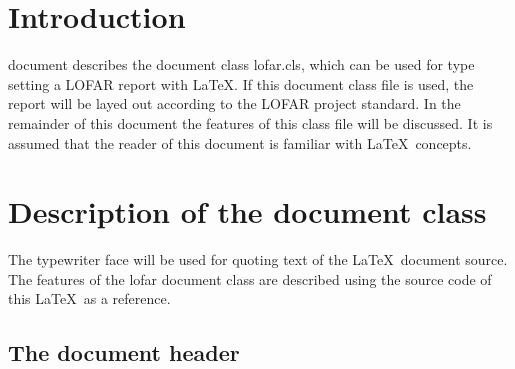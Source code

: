 \documentclass[]{lofar}
\begin{document}
\maketitle
\newpage
%
\theDistributionList
\vspace{1cm}
\theDocumentRevision
\newpage
%
\begin{abstract}
The author has written a document class file \textsf{lofar.cls}, which
may be used to type set reports with \LaTeX. The document class takes
care of type setting a report according to the LOFAR documentation
standard. In this note a description of this document class is
presented. This document is only useful for people who write there
reports with \LaTeX.
\end{abstract}
\newpage
%
\tableofcontents
\newpage

\section{Introduction}
\label{Sec1}

 document describes the document class \textsf{lofar.cls}, 
which can be used for type setting a LOFAR report with \LaTeX. If this
document class file is used, the report will be layed out according to
the LOFAR project standard.  In the remainder of this document the
features of this class file will be discussed. It is assumed that the
reader of this document is familiar with \LaTeX\ concepts.

\section{Description of the document class}
\label{Sec2}
%
The typewriter face will be used for quoting text of the \LaTeX\
document source.  The features of the lofar document class are
described using the source code of this \LaTeX\ as a reference.

\subsection{The document header}
\end{document}
